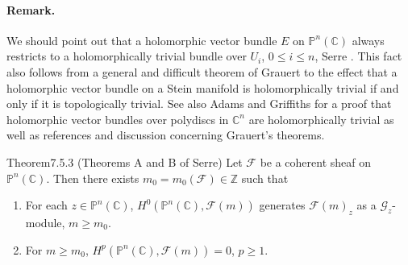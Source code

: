\paragraph{Remark.} We should point out that a holomorphic vector bundle $E$ on $\mathbb P^n(\mathbb C)$ always restricts to a holomorphically trivial bundle over $U_i$, $0\leq i\leq n$, Serre \cite{bib:II:serre-j-p:2}. This fact also follows from a general and difficult theorem of Grauert to the effect that a holomorphic vector bundle on a Stein manifold is holomorphically trivial if and only if it is topologically trivial. See also Adams and Griffiths \cite{bib:II:adams-j-f-and-griffiths-p:1} for a proof that holomorphic vector bundles over polydiscs in $\mathbb C^n$ are holomorphically trivial as well as references and discussion concerning Grauert's theorems.
\begin{originaltheorem}{Theorem}{7.5.3 (Theorems A and B of Serre)}
Let $\mathcal F$ be a coherent sheaf on $\mathbb P^n(\mathbb C)$. Then there exists $m_0=m_0(\mathcal F)\in\mathbb Z$ such that
\begin{enumerate}[label=\Alph*.]
\item For each $z\in\mathbb P^n(\mathbb C)$, $H^0(\mathbb P^n(\mathbb C),\mathcal F(m))$ generates $\mathcal F(m)_z$ as a $\mathcal G_z$-module, $m\geq m_0$.
\item For $m\geq m_0$, $H^p(\mathbb P^n(\mathbb C),\mathcal F(m))=0$, $p\geq1$.
\end{enumerate}
\end{originaltheorem}
